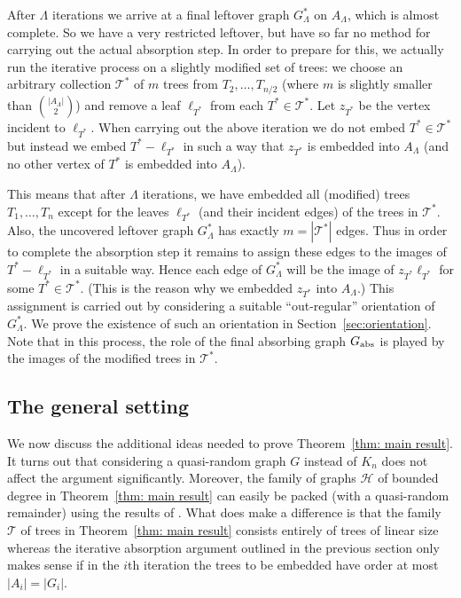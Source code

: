 \documentclass[a4paper, 11pt, reqno]{amsart}
\numberwithin{equation}{section}
\newcommand{\1}{{\rm 1\hspace*{-0.4ex}%
\rule{0.1ex}{1.52ex}\hspace*{0.2ex}}}
\newcommand{\cT}{\mathcal{T}}
\newcommand{\cH}{\mathcal{H}}
\newcounter{step}
\begin{document}
After $\Lambda$ iterations we arrive at a final leftover graph $G_\Lambda^*$ on $A_\Lambda$,
which is almost complete.
So we have a very restricted leftover,
but have so far no method for carrying out the actual absorption step.
In order to prepare for this,
we actually run the iterative process on a slightly modified set of trees:
we choose an arbitrary collection $\cT^*$ of $m$ trees
from $T_2,\ldots,T_{n/2}$ (where $m$ is slightly smaller than $\binom{|A_\Lambda|}{2}$)
and remove a leaf $\ell_{T^*}$ from each $T^*\in \cT^*$.
Let $z_{T^*}$ be the vertex incident to $\ell_{T^*}$.
When carrying out the above iteration we do not embed $T^*\in \cT^*$ but instead we embed $T^*-\ell_{T^*}$
in such a way that $z_{T^*}$ is embedded into $A_\Lambda$
(and no other vertex of $T^*$ is embedded into $A_\Lambda$).

This means that after $\Lambda$ iterations,
we have embedded all (modified) trees $T_1,\ldots,T_n$
except for the leaves $\ell_{T^*}$ (and their incident edges) of the trees in $\cT^*$.
Also,
the uncovered leftover graph $G_{\Lambda}^*$ has exactly $m=|\cT^*|$ edges.
Thus in order to complete the absorption step 
it remains to assign these edges to the images of $T^*-\ell_{T^*}$ in a suitable way.
Hence each edge of $G_{\Lambda}^*$ will be the image of $z_{T^*}\ell_{T^*}$ for some $T^*\in \cT^*$.
(This is the reason why we embedded $z_{T^*}$ into $A_\Lambda$.)
This assignment is carried out by considering a suitable ``out-regular'' orientation of $G_{\Lambda}^*$.
We prove the existence of such an orientation in Section~\ref{sec:orientation}.
Note that in this process,
the role of the final absorbing graph $G_{\rm abs}$ is played by the images of the modified trees in $\cT^*$.





\subsection{The general setting}
We now discuss the additional ideas needed to prove Theorem~\ref{thm: main result}.
It turns out that considering a quasi-random graph $G$ instead of $K_n$ does not affect the argument significantly.
Moreover,
the family of graphs $\cH$ of bounded degree in Theorem~\ref{thm: main result} can easily be packed (with a quasi-random remainder)
using the results of \cite{KKOT16}.
What does make a difference is that the family $\cT$ of trees in Theorem~\ref{thm: main result} consists entirely of trees of linear size whereas the iterative absorption argument outlined in the previous section only makes sense if in the $i$th iteration
the trees to be embedded have order at most $|A_i|=|G_i|$.
\end{document}
